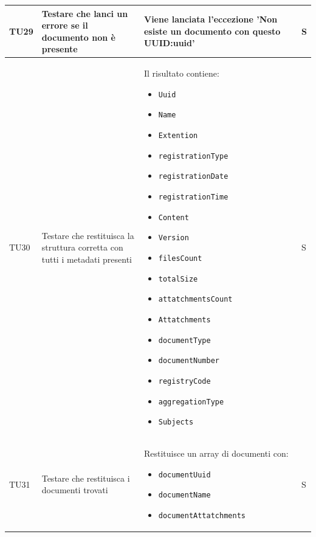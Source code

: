 \documentclass[a4paper,12pt]{article}
\begin{document}
\begin{longtable}{|M{1.2cm}|M{5cm}|M{8cm}|M{1.5cm}|}
            TU29 & Testare che \texttt{} lanci un errore se il documento non è presente & Viene lanciata l'eccezione 'Non esiste un documento con questo UUID:uuid' & S \\
            \hline

            TU30 & Testare che \texttt{} restituisca la struttura corretta con tutti i metadati presenti & Il risultato contiene:
            \begin{itemize}[leftmargin=*]
                \item \texttt{Uuid}
                \item \texttt{Name}
                \item \texttt{Extention}
                \item \texttt{registrationType}
                \item \texttt{registrationDate}
                \item \texttt{registrationTime}
                \item \texttt{Content}
                \item \texttt{Version}
                \item \texttt{filesCount}
                \item \texttt{totalSize}
                \item \texttt{attatchmentsCount}
                \item \texttt{Attatchments}
                \item \texttt{documentType}
                \item \texttt{documentNumber}
                \item \texttt{registryCode}
                \item \texttt{aggregationType}
                \item \texttt{Subjects}
            \end{itemize} & S \\
            \hline

            TU31 & Testare che \texttt{} restituisca i documenti trovati & Restituisce un array di documenti con:
            \begin{itemize}[leftmargin=*]
                \item \texttt{documentUuid}
                \item \texttt{documentName}
                \item \texttt{documentAttatchments}
            \end{itemize} & S \\
            \hline


\end{longtable}
\end{document}

